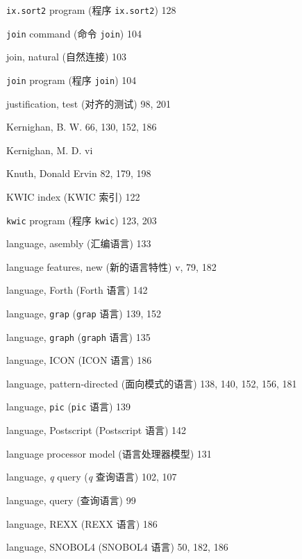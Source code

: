\begin{multicols}{2}
\hangindent=2pc  \verb'ix.sort2' program (程序 \verb'ix.sort2') 128 

\hangindent=2pc  \verb'join' command (命令 \verb'join') 104

\hangindent=2pc  join, natural (自然连接) 103

\hangindent=2pc  \verb'join' program (程序 \verb'join') 104

\hangindent=2pc  justification, test (对齐的测试) 98, 201

\hangindent=2pc  Kernighan, B. W. 66, 130, 152, 186

\hangindent=2pc  Kernighan, M. D. vi 

\hangindent=2pc  Knuth, Donald Ervin 82, 179, 198

\hangindent=2pc  KWIC index (KWIC 索引) 122

\hangindent=2pc  \verb'kwic' program (程序 \verb'kwic') 123, 203

\hangindent=2pc  language, asembly (汇编语言) 133

\hangindent=2pc  language features, new (新的语言特性) v, 79, 182

\hangindent=2pc  language, Forth (Forth 语言) 142

\hangindent=2pc  language, \verb'grap' (\verb'grap' 语言) 139, 152

\hangindent=2pc  language, \verb'graph' (\verb'graph' 语言) 135

\hangindent=2pc  language, ICON (ICON 语言) 186

\hangindent=2pc  language, pattern-directed (面向模式的语言) 138, 140, 152, 156, 181

\hangindent=2pc  language, \verb'pic' (\verb'pic' 语言) 139

\hangindent=2pc  language, Postscript (Postscript 语言) 142

\hangindent=2pc  language processor model (语言处理器模型) 131

\hangindent=2pc  language, \textit{q} query (\textit{q}
查询语言) 102, 107

\hangindent=2pc  language, query (查询语言) 99

\hangindent=2pc  language, REXX (REXX 语言) 186

\hangindent=2pc  language, SNOBOL4 (SNOBOL4 语言) 50, 182, 186


\end{multicols}
